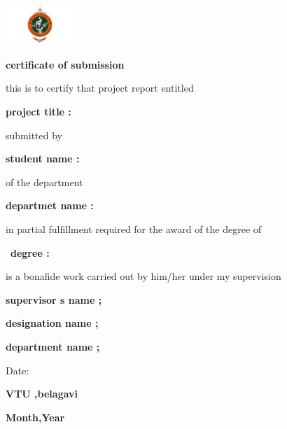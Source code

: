 \documentclass[a4paper,12pt]{report}
\begin{document}
\begin{titlepage}
\centering
\includegraphics[width=0.2\textwidth]{vtu-logo.jpg}\par\vspace{1cm}
\vspace{1cm}
{\bfseries\LARGE certificate of submission\par}
\vspace{1.5cm}
\begin{flushleft}
\Large
this is to certify that project report entitled \par
\textbf{project title : 
\underline{\hspace{7cm}}}\par
submitted by \par
\textbf{student name : \underline{\hspace{7cm}}}\par
of the department \par\textbf{departmet name :\underline { \hspace{7cm}}}\par
in partial fulfillment required for the award of the degree of \par\
\textbf{degree : \underline{\hspace{7cm}}}\par 
is a bonafide work carried out by him/her under my supervision 
\end{flushleft}
\vspace{2cm}
\begin{flushright}
\Large
\begin{flushright}
\Large
\textbf{supervisor s name ; \underline{\hspace{7cm}}}\par
\textbf{designation name ; \underline{\hspace{7cm}}}\par
\textbf{department name ; \underline{\hspace{7cm}}}\par
\vspace{0.5cm}
\large
Date:\underline{\hspace{5cm}}
\end{flushright}
\vspace{2cm}                                                                               
\begin{center}
\Large
\textbf{VTU ,belagavi}\par
\large
\textbf{Month,Year}
\end{center}
\end{flushright}
\end{titlepage}
\end{document}
